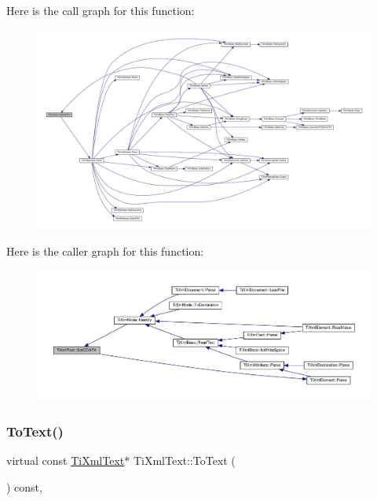 Here is the call graph for this function\+:
\nopagebreak
\begin{figure}[H]
\begin{center}
\leavevmode
\includegraphics[width=350pt]{class_ti_xml_text_acb17ff7c5d09b2c839393445a3de5ea9_cgraph}
\end{center}
\end{figure}
Here is the caller graph for this function\+:
\nopagebreak
\begin{figure}[H]
\begin{center}
\leavevmode
\includegraphics[width=350pt]{class_ti_xml_text_acb17ff7c5d09b2c839393445a3de5ea9_icgraph}
\end{center}
\end{figure}
\mbox{\label{class_ti_xml_text_af8973cfd4ca00c5d934cb23e8aa0f5d5}} 
\subsubsection{\texorpdfstring{To\+Text()}{ToText()}\hspace{0.1cm}{\footnotesize\ttfamily [1/2]}}
{\footnotesize\ttfamily virtual const \hyperlink{class_ti_xml_text}{Ti\+Xml\+Text}$\ast$ Ti\+Xml\+Text\+::\+To\+Text (\begin{DoxyParamCaption}{ }\end{DoxyParamCaption}) const\hspace{0.3cm}{\ttfamily [inline]}, {\ttfamily [virtual]}}



